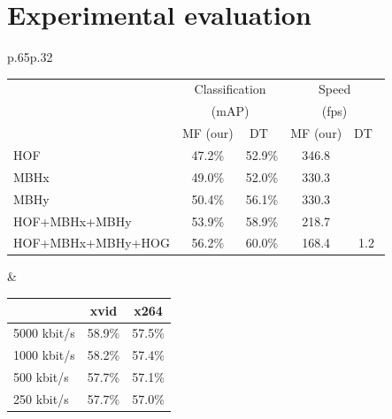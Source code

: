 \documentclass[10pt,twocolumn,letterpaper]{article}
\begin{document}
\section{Experimental evaluation}
\label{sec:experiments}



\begin{table}[t!]
\begin{center}
\begin{tabular}{p{}p{}}
\hspace*{.4cm}
\begin{tabular}{|l||c|c||c|c|}
\hline
\multirow{3}{*}{} &\multicolumn{2}{c||}{Classification} & \multicolumn{2}{c|}{Speed}\\
                  &\multicolumn{2}{c||}{(mAP)} & \multicolumn{2}{c|}{(fps)}\\
\cline{2-5}
& MF (our) & DT~\cite{Wang12} & MF (our) & DT~\cite{Wang12}\\
\hline\hline
HOF               & 47.2\% & 52.9\% & 346.8 &  \\\hline
MBHx              & 49.0\% & 52.0\% & 330.3 &  \\\hline
MBHy              & 50.4\% & 56.1\% & 330.3 &  \\\hline
HOF+MBHx+MBHy     & 53.9\% & 58.9\% & 218.7 &  \\\hline
HOF+MBHx+MBHy+HOG & 56.2\% & 60.0\% & 168.4 & 1.2 \\\hline
\end{tabular}
&
\mbox{}\vspace{-.55cm}\newline
\hspace*{.2cm}
\begin{tabular}{|l|c|c|}
\hline
             & xvid  & x264  \\\hline
5000 kbit/s  & 58.9\% & 57.5\% \\\hline
1000 kbit/s   & 58.2\% & 57.4\% \\\hline
500 kbit/s   & 57.7\% & 57.1\% \\\hline
250 kbit/s   & 57.7\% & 57.0\% \\\hline
\end{tabular}
%

\end{tabular}
\end{center}
\end{table}
\end{document}
